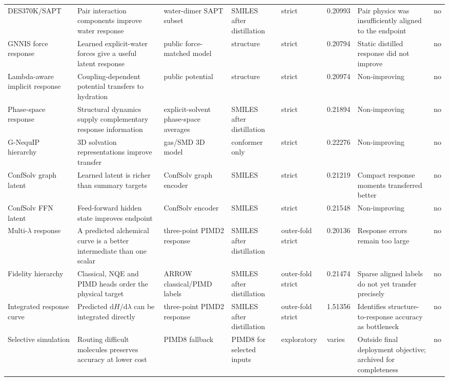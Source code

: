 \documentclass[10pt]{article}
\begin{document}
\begin{landscape}
\begin{longtable}{p{2.8cm}p{4.0cm}p{3.1cm}p{2.4cm}p{1.8cm}p{1.5cm}p{4.3cm}p{1.6cm}}
DES370K/SAPT & Pair interaction components improve water response & water-dimer SAPT subset & SMILES after distillation & strict & 0.20993 & Pair physics was insufficiently aligned to the endpoint & no \\
GNNIS force response & Learned explicit-water forces give a useful latent response & public force-matched model & structure & strict & 0.20794 & Static distilled response did not improve & no \\
Lambda-aware implicit response & Coupling-dependent potential transfers to hydration & public potential & structure & strict & 0.20974 & Non-improving & no \\
Phase-space response & Structural dynamics supply complementary response information & explicit-solvent phase-space averages & SMILES after distillation & strict & 0.21894 & Non-improving & no \\
G-NequIP hierarchy & 3D solvation representations improve transfer & gas/SMD 3D model & conformer only & strict & 0.22276 & Non-improving & no \\
ConfSolv graph latent & Learned latent is richer than summary targets & ConfSolv graph encoder & SMILES & strict & 0.21219 & Compact response moments transferred better & no \\
ConfSolv FFN latent & Feed-forward hidden state improves endpoint & ConfSolv encoder & SMILES & strict & 0.21548 & Non-improving & no \\
Multi-$\lambda$ response & A predicted alchemical curve is a better intermediate than one scalar & three-point PIMD2 response & SMILES after distillation & outer-fold strict & 0.20136 & Response errors remain too large & no \\
Fidelity hierarchy & Classical, NQE and PIMD heads order the physical target & ARROW classical/PIMD labels & SMILES after distillation & outer-fold strict & 0.21474 & Sparse aligned labels do not yet transfer precisely & no \\
Integrated response curve & Predicted $\mathrm{d}H/\mathrm{d}\lambda$ can be integrated directly & three-point PIMD2 response & SMILES after distillation & outer-fold strict & 1.51356 & Identifies structure-to-response accuracy as bottleneck & no \\
Selective simulation & Routing difficult molecules preserves accuracy at lower cost & PIMD8 fallback & PIMD8 for selected inputs & explor\-atory & varies & Outside final deployment objective; archived for completeness & no \\
\bottomrule
\end{longtable}
\end{landscape}
\end{document}
